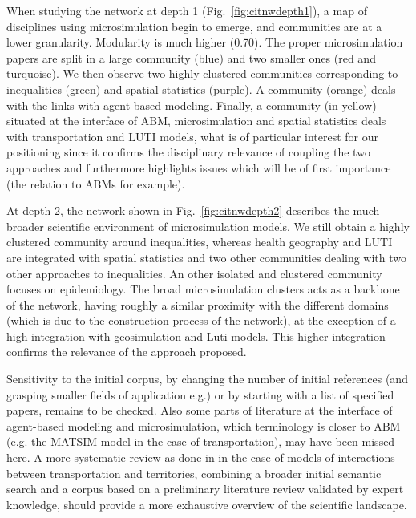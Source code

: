 \documentclass[11pt]{article}
\begin{document}
When studying the network at depth 1 (Fig.~\ref{fig:citnwdepth1}), a map of disciplines using microsimulation begin to emerge, and communities are at a lower granularity. Modularity is much higher (0.70). The proper microsimulation papers are split in a large community (blue) and two smaller ones (red and turquoise). We then observe two highly clustered communities corresponding to inequalities (green) and spatial statistics (purple). A community (orange) deals with the links with agent-based modeling. Finally, a community (in yellow) situated at the interface of ABM, microsimulation and spatial statistics deals with transportation and LUTI models, what is of particular interest for our positioning since it confirms the disciplinary relevance of coupling the two approaches and furthermore highlights issues which will be of first importance (the relation to ABMs for example).

At depth 2, the network shown in Fig.~\ref{fig:citnwdepth2} describes the much broader scientific environment of microsimulation models. We still obtain a highly clustered community around inequalities, whereas health geography and LUTI are integrated with spatial statistics and two other communities dealing with two other approaches to inequalities. An other isolated and clustered community focuses on epidemiology. The broad microsimulation clusters acts as a backbone of the network, having roughly a similar proximity with the different domains (which is due to the construction process of the network), at the exception of a high integration with geosimulation and Luti models. This higher integration confirms the relevance of the approach proposed.

Sensitivity to the initial corpus, by changing the number of initial references (and grasping smaller fields of application e.g.) or by starting with a list of specified papers, remains to be checked. Also some parts of literature at the interface of agent-based modeling and microsimulation, which terminology is closer to ABM (e.g. the MATSIM model in the case of transportation), may have been missed here. A more systematic review as done in \cite{raimbault2018caracterisation} in the case of models of interactions between transportation and territories, combining a broader initial semantic search and a corpus based on a preliminary literature review validated by expert knowledge, should provide a more exhaustive overview of the scientific landscape.
\end{document}
